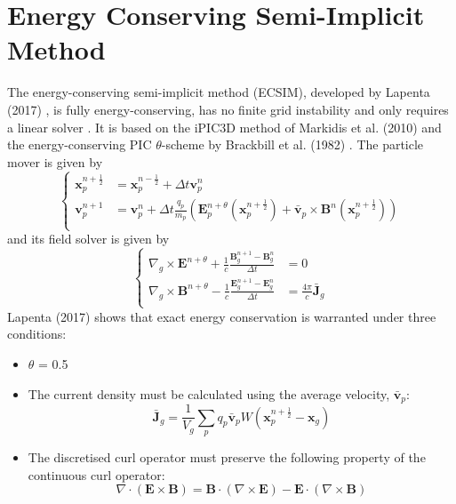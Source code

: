 \section{Energy Conserving Semi-Implicit Method}
\label{subsec: plasma intro ECSIM}
The energy-conserving semi-implicit method (ECSIM), developed by Lapenta (2017) \cite{lapenta_exactly_2017}, is fully energy-conserving, has no finite grid instability and only requires a linear solver \cite{lapenta_exactly_2017}. It is based on the iPIC3D method of Markidis et al. (2010) \cite{markidis_multi-scale_2010} and the energy-conserving PIC $\theta$-scheme by Brackbill et al. (1982) \cite{brackbill_implicit_1982}. The particle mover is given by 
\begin{equation}
\left\{\begin{aligned} 
	\textbf{x}_p^{n+\frac{1}{2}} &= \textbf{x}_p^{n-\frac{1}{2}} + \Delta t \textbf{v}_p^{n} \\
	\textbf{v}_p^{n+1} &= \textbf{v}_p^{n} + \Delta t \frac{q_p}{m_p}\left(\textbf{E}^{n+\theta}_p(\textbf{x}_p^{n+\frac{1}{2}}) + \bar{\textbf{v}}_p \times \textbf{B}^n(\textbf{x}_p^{n+\frac{1}{2}})\right)\\
 \end{aligned}\right.
\end{equation}
and its field solver is given by
\begin{equation}
\left\{\begin{aligned} 
 	\nabla_g \times \mathbf{E}^{n + \theta} +\frac{1}{c}\frac{\mathbf{B}_g^{n+1} - \mathbf{B}_g^{n}}{\Delta t} &= 0 \\
 	\nabla_g \times \mathbf{B}^{n+ \theta} -\frac{1}{c}\frac{\mathbf{E}_g^{n+1} - \mathbf{E}_g^{n}}{\Delta t} &= \frac{4 \pi}{c}\bar{\mathbf{J}}_g\\
 \end{aligned}\right.
\end{equation}
Lapenta (2017) \cite{lapenta_exactly_2017} shows that exact energy conservation is warranted under three conditions:
\begin{itemize}
    \item $\theta$ = 0.5
    \item The current density must be calculated using the average velocity, $\bar{\textbf{v}}_p$: \[\bar{\mathbf{J}}_g = \frac{1}{V_g} \sum_{p} q_p \bar{\textbf{v}}_p W(\textbf{x}_p^{n+\frac{1}{2}} - \textbf{x}_g )\]
    \item The discretised curl operator must preserve the following property of the continuous curl operator:
    \[\nabla \cdot (\textbf{E} \times \textbf{B}) = \textbf{B} \cdot (\nabla \times \textbf{E}) - \textbf{E} \cdot (\nabla \times \textbf{B})\]
\end{itemize}
